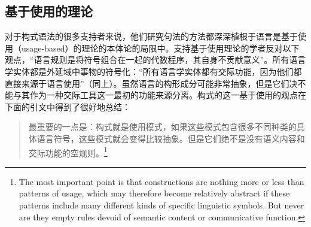 \subsection{基于使用的理论}\label{usage-based-sec}
    对于构式语法的很多支持者来说，他们研究句法的方法都深深植根于语言是基于使用（usage-based）的理论\citep{Langacker87a-u, Goldberg95a,Croft2001a, Tomasello2003a}的本体论的局限中。支持基于使用理论的学者反对以下观点，“语言规则是将符号组合在一起的代数程序，其自身不贡献意义”\citep[]{Tomasello2003a}。所有语言学实体都是外延域中事物的符号化：“所有语言学实体都有交际功能，因为他们都直接来源于语言使用”（同上）。虽然语言的构形成分可能非常抽象，但是它们决不能与其作为一种交际工具这一最初的功能来源分离。构式的这一基于使用的观点在下面的引文中得到了很好地总结：
\begin{quote}
最重要的一点是：构式就是使用模式，如果这些模式包含很多不同种类的具体语言符号，这些模式就会变得比较抽象。但是它们绝不是没有语义内容和交际功能的空规则。\citep[]{Tomasello2003a}\footnote{%
The most important point is that constructions are nothing more or less than patterns of usage,
which may therefore become relatively abstract if these patterns include many different kinds of
specific linguistic symbols.  But never are they empty rules devoid of semantic content or
communicative function.
}
\end{quote}


